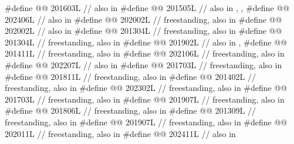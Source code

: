 \begin{codeblock}
#define @@                             201603L // also in 
#define @@     201505L
  // also in , , 
#define @@                    202406L // also in 
#define @@                          202002L // freestanding, also in 
#define @@      202002L // also in 
#define @@                  201304L // freestanding, also in 
#define @@        201304L // freestanding, also in 
#define @@                       201902L // also in , 
#define @@                            201411L // freestanding, also in 
#define @@                          202106L // freestanding, also in 
#define @@                     202207L // also in 
#define @@                      201703L // freestanding, also in 
#define @@             201811L // freestanding, also in 
#define @@                          201402L // freestanding, also in 
#define @@              202302L // freestanding, also in 
#define @@                      201703L // freestanding, also in 
#define @@              201907L // freestanding, also in 
#define @@            201806L // freestanding, also in 
#define @@                   201309L // freestanding, also in 
#define @@       201907L // freestanding, also in 
#define @@                    202011L // freestanding, also in 
#define @@           202411L // also in 

\end{codeblock}

